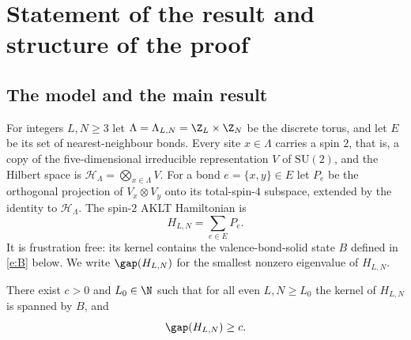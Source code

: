 \section{Statement of the result and structure of the proof}\label{s:intro}

\subsection{The model and the main result}

For integers $L, N \ge 3$ let $\Lambda = \Lambda_{L, N} = \Z_L \times \Z_N$ be the discrete torus, and let $E$ be its set of nearest-neighbour bonds. Every site $x \in \Lambda$ carries a spin $2$, that is, a copy of the five-dimensional irreducible representation $V$ of $\mathrm{SU}(2)$, and the Hilbert space is $\mathcal H_\Lambda = \bigotimes_{x \in \Lambda} V$. For a bond $e = \{x, y\} \in E$ let $P_e$ be the orthogonal projection of $V_x \otimes V_y$ onto its total-spin-$4$ subspace, extended by the identity to $\mathcal H_\Lambda$. The spin-$2$ AKLT Hamiltonian \cite{AKLT88} is
\begin{equation}\label{e:H}
H_{L, N} = \sum_{e \in E} P_e .
\end{equation}
It is frustration free: its kernel contains the valence-bond-solid state $B$ defined in \eqref{e:B} below. We write $\gap(H_{L, N})$ for the smallest nonzero eigenvalue of $H_{L, N}$.

\begin{theorem}\label{t:main}
There exist $c > 0$ and $L_0 \in \N$ such that for all even $L, N \ge L_0$ the kernel of $H_{L, N}$ is spanned by $B$, and
\begin{equation*}
\gap(H_{L, N}) \ge c .
\end{equation*}
\end{theorem}

